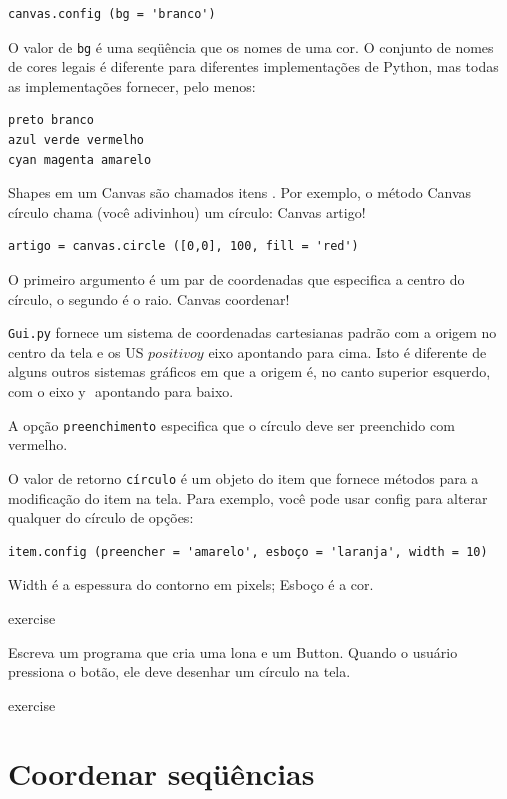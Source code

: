 \documentclass[10pt]{book}
\begin{document}
\begin{exercise}
\begin{v erbatim}
\begin{verbatim}
canvas.config (bg = 'branco')
\end{verbatim}
%
O valor de {\tt bg} é uma seqüência
que os nomes de uma cor. O conjunto de nomes de cores legais é diferente
para diferentes implementações de Python, mas todas as implementações
fornecer, pelo menos:

\begin{verbatim}
preto branco
azul verde vermelho   
cyan magenta amarelo
\end{verbatim}
%
Shapes em um Canvas são chamados itens {\bf}. Por exemplo,
o método Canvas {círculo \tt} chama (você adivinhou) um círculo:
{Canvas artigo!} \Index

\begin{verbatim}
artigo = canvas.circle ([0,0], 100, fill = 'red')
\end{verbatim}
%
O primeiro argumento é um par de coordenadas que especifica a
centro do círculo, o segundo é o raio.
{Canvas coordenar!} \Index

{\tt Gui.py} fornece um sistema de coordenadas cartesianas padrão com
a origem no centro da tela e os US $ positivo y $ eixo
apontando para cima. Isto é diferente de alguns outros sistemas gráficos
em que a origem é, no canto superior esquerdo, com o eixo y $ $
apontando para baixo.

A opção {\tt preenchimento} especifica que o círculo deve ser preenchido
com vermelho.

O valor de retorno {\tt círculo} é um objeto do item que
fornece métodos para a modificação do item na tela. Para
exemplo, você pode usar {config \tt} para alterar qualquer do círculo de
opções:

\begin{verbatim}
item.config (preencher = 'amarelo', esboço = 'laranja', width = 10)
\end{verbatim}
%
{Width \tt} é a espessura do contorno em pixels;
{Esboço \tt} é a cor.

\begin{} exercise
\label{círculo}

Escreva um programa que cria uma lona e um Button. Quando o
usuário pressiona o botão, ele deve desenhar um círculo na tela.

\end{} exercise


\section{Coordenar seqüências}


\end{v erbatim}
\end{exercise}
\end{document}
